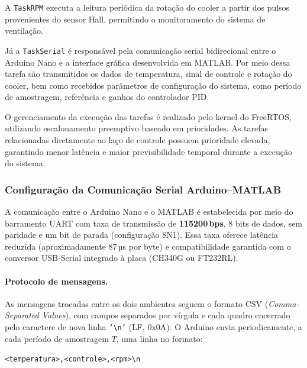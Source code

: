 \documentclass[repeatfields,xlists,xpacks,oneside]{ufrgscca}
\begin{document}
A \texttt{TaskRPM} executa a leitura periódica da rotação
do cooler a partir dos pulsos provenientes do sensor Hall,
permitindo o monitoramento do sistema de ventilação.

Já a \texttt{TaskSerial} é responsável pela comunicação
serial bidirecional entre o Arduino Nano e a interface
gráfica desenvolvida em MATLAB.
Por meio dessa tarefa são transmitidos os dados de
temperatura, sinal de controle e rotação do cooler,
bem como recebidos parâmetros de configuração do sistema,
como período de amostragem, referência e ganhos do
controlador PID.

O gerenciamento da execução das tarefas é realizado pelo
kernel do FreeRTOS, utilizando escalonamento preemptivo
baseado em prioridades.
As tarefas relacionadas diretamente ao laço de controle
possuem prioridade elevada, garantindo menor latência
e maior previsibilidade temporal durante a execução do
sistema.

\subsubsection{Configuração da Comunicação Serial Arduino--MATLAB}

A comunicação entre o Arduino Nano e o MATLAB é estabelecida
por meio do barramento UART com taxa de transmissão de
\textbf{115200\,bps}, 8 bits de dados, sem paridade e um bit
de parada (configuração 8N1). Essa taxa oferece latência
reduzida (aproximadamente 87\,µs por byte) e
compatibilidade garantida com o conversor USB-Serial
integrado à placa (CH340G ou FT232RL).

\paragraph{Protocolo de mensagens.}
As mensagens trocadas entre os dois ambientes seguem o
formato CSV (\textit{Comma-Separated Values}), com campos
separados por vírgula e cada quadro encerrado pelo caractere
de nova linha \texttt{`\textbackslash n'} (LF, 0x0A).
O Arduino envia periodicamente, a cada período de amostragem
$T$, uma linha no formato:

\begin{center}
\texttt{<temperatura>,<controle>,<rpm>\textbackslash n}
\end{center}
\end{document}
